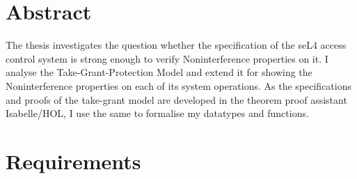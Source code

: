 \documentclass[11pt,a4paper,twoside]{article}
\begin{document}
	
\deckblatt
	
	
\declaration
{}

\clearpage
\section*{Abstract}
	
The thesis investigates the question whether the specification of the seL4 access control system is strong enough to verify Noninterference properties on it. I analyse the Take-Grant-Protection Model \cite{TakeG} and extend it for showing the Noninterference properties \cite{InfFlow} on each of its system operations. 
As the specifications and proofs of the take-grant model are developed in the theorem proof assistant Isabelle/HOL, I use the same to formalise my datatypes and functions. 
	

\newpage
\listoffigures
\newpage
\tableofcontents

	
\clearpage

	 
\newpage
\section{Requirements}

\newpage

\clearpage

\newpage
 
\newpage

\newpage

\newpage

\newpage
\end{document}
